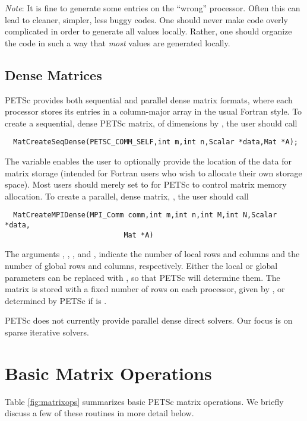 {\em Note}: It is fine to generate some entries on the ``wrong'' processor. Often
this can lead to cleaner, simpler, less buggy codes.  One should never
make code overly complicated in order to generate all values locally. Rather,
one should organize the code in such a way that {\em most} values are generated locally.

\subsection{Dense Matrices}
\label{sec:matdense}

PETSc provides both sequential and parallel dense matrix formats,
where each processor stores its entries in a column-major array in the
usual Fortran style.  To create a sequential, dense PETSc matrix,
 of dimensions  by , the user should
call 
\begin{verbatim}
  MatCreateSeqDense(PETSC_COMM_SELF,int m,int n,Scalar *data,Mat *A);
\end{verbatim}
The variable  enables the user to optionally provide the
location of the data for matrix storage (intended for Fortran users who
wish to allocate their own storage space).  Most users should merely
set  to  for PETSc to control matrix memory allocation.
To create a parallel, dense matrix, , the user should call
\begin{verbatim}
  MatCreateMPIDense(MPI_Comm comm,int m,int n,int M,int N,Scalar *data,
                            Mat *A)
\end{verbatim}
The arguments , , 
, and , indicate the number of local rows and columns and
the number of global rows and columns, respectively. Either the local or
global parameters can be replaced with , so that 
PETSc will determine  them.
The matrix is stored with a fixed number of rows on 
each processor, given by , or determined by PETSc if  is
. 

PETSc does not currently provide parallel dense direct solvers. Our focus is on 
sparse iterative solvers.

\section{Basic Matrix Operations}
\label{sec:matoptions}

Table \ref{fig:matrixops} summarizes basic PETSc matrix operations.
We briefly discuss a few of these routines in more detail below.

